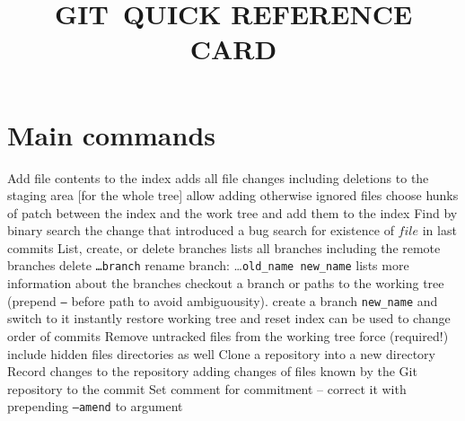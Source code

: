 
\def\content{GIT}
\def\versionnumber{1.1}  %
\def\year{2014}
\def\month{May}
\def\version{v\versionnumber\ \month\ \year}



\title{\uppercase{\content\ quick reference card}}

\shortintro

\section{Main commands}{}
	{Add file contents to the index}
	{adds all file changes including deletions to the staging area [for the whole tree]}
	{allow adding otherwise ignored files}
	{choose hunks of patch between the index and the work tree and add them to the index}
	{Find by binary search the change that introduced a bug}
	{search for existence of $file$ in last commits}
	{List, create, or delete branches}
	{lists all branches including the remote branches}
	{delete {\tt \dots branch}}
	{rename branch: \dots {\tt old\_name new\_name}}
	{lists more information about the branches}
	{checkout a branch or paths to the working tree (prepend {\tt --} before path to avoid ambiguousity).}
	{create a branch {\tt new\_name} and switch to it instantly}
	{restore working tree and reset index}
	{can be used to change order of commits}
	{Remove untracked files from the working tree}
	{force (required!)}
	{include hidden files}
	{directories as well}
	{Clone a repository into a new directory}
	{Record changes to the repository}
	{adding changes of files known by the Git repository to the commit}
	{Set comment for commitment -- correct it with prepending {\tt --amend} to argument}
